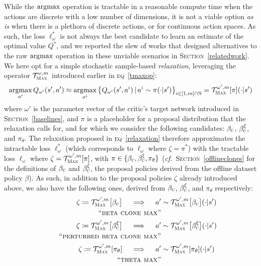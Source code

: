 While the $\operatorname*{\arg\!\max}$ operation is tractable in a reasonable compute time when the actions are discrete
with a low number of dimensions, it is not a viable option \textit{as is}
when there is a plethora of discrete actions, or for continuous action spaces.
As such, the loss $\ell^*_\omega$ is not always the best candidate to learn
an estimate of the optimal value $Q^*$,
and we reported the slew of works that designed alternatives to the raw $\operatorname*{\arg\!\max}$ operation
in these unviable scenarios in \textsc{Section}~\ref{relatedwork}.
We here opt for a simple stochastic sample-based \emph{relaxation}, leveraging the operator
$\mathcal{T}_\textsc{Max}^{\omega, m}$
introduced earlier in \textsc{eq}~\ref{tmaxop}:
\begin{align}
\operatorname*{\arg\!\max}_{a'}Q_{\omega'}(s',a') \approx
\operatorname*{\arg\!\max}_{a^i} \big\{ Q_{\omega'}(s', a^i) \, | \, a^i \sim \pi(\cdot | s')\big\}_{i \in [1,m] \cap \mathbb{N}}
= \mathcal{T}_\textsc{Max}^{\omega', m}[\pi](\cdot | s')
\label{relaxation}
\end{align}
where $\omega'$ is the parameter vector of the critic's target network introduced in \textsc{Section}~\ref{baselines},
and $\pi$ is a placeholder for a proposal distribution that the relaxation calls for, and for which we
consider the following candidates: $\beta_\textsc{c}$, $\beta_\textsc{c}^\xi$, and $\pi_\theta$.
The relaxation proposed in \textsc{eq}~\ref{relaxation} therefore
approximates the intractable loss
$\ell^*_\omega$ (which corresponds to $\ell_\omega$ where $\zeta = \pi^*$)
with the tractable loss $\ell_\omega$ where $\zeta = \mathcal{T}_\textsc{Max}^{\omega', m}[\pi]$,
with $\pi \in \{ \beta_\textsc{c},\beta_\textsc{c}^\xi,\pi_\theta \}$
(\textit{cf.}~\textsc{Section}~\ref{offlineclones} for the definitions of
$\beta_\textsc{c}$ and $\beta_\textsc{c}^\xi$, the proposal policies derived from the offline dataset policy $\beta$).
As such, in addition to the proposal policies $\zeta$ already introduced above,
we also have the following ones, derived from
$\beta_\textsc{c}$, $\beta_\textsc{c}^\xi$, and $\pi_\theta$ respectively:
\begin{align}
  \zeta \coloneqq \mathcal{T}_\textsc{Max}^{\omega', m}\big[\beta_\textsc{c}\big]
  \quad \implies \quad
  a' &\sim \mathcal{T}_\textsc{Max}^{\omega', m}\big[\beta_\textsc{c}\big](\cdot | s')
  \\ \tag*{\textsc{``beta clone max''}}
  \label{betaclonemax} \\
  \zeta \coloneqq \mathcal{T}_\textsc{Max}^{\omega', m}\big[\beta_\textsc{c}^\xi\big]
  \quad \implies \quad
  a' &\sim \mathcal{T}_\textsc{Max}^{\omega', m}\big[\beta_\textsc{c}^\xi\big](\cdot | s')
  \\ \tag*{\textsc{``perturbed beta clone max''}}
  \label{perturbedbetaclonemax} \\
  \zeta \coloneqq \mathcal{T}_\textsc{Max}^{\omega', m}[\pi_\theta]
  \quad \implies \quad
  a' &\sim \mathcal{T}_\textsc{Max}^{\omega', m}[\pi_\theta](\cdot | s')
  \\ \tag*{\textsc{``theta max''}}
  \label{thetamax}
\end{align}
